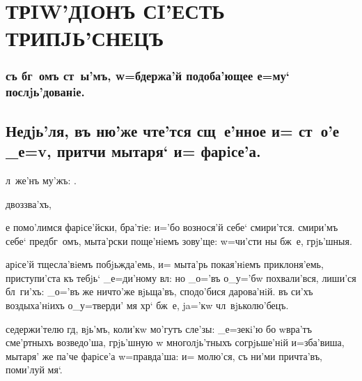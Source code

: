 \documentclass[12pt,a5paper,dvips,civil=antiqua]{hipbook}
\begin{document}

\maketitle

\stdsecondpage
\clearpage

\hdrcrosspage

\section[трiw'дiонъ]{\large\MakeUppercase{трiw'дiонъ сi'есть трипjь'снецъ}}

\subsubsection{съ бг~омъ ст~ы'мъ, w=бдержа'й подоба'ющее е=му` послjь'дованiе.}

\subsection[Недjь'ля мытаря` и= фарiсе'а]
{Недjь'ля, въ ню'же чте'тся сщ~е'нное и= ст~о'е _е=v, притчи
  мытаря` и= фарiсе'а.}

 л~же'нъ му'жъ: .

 д воззва'хъ, 

е помо'лимся фарiсе'йски, бра'тiе: и='бо вознося'й себе`
смири'тся. смири'мъ себе` пред\ъ бг~омъ, мыта'рски поще'нiемъ зову'ще:
w=чи'сти ны бж~е, грjь'шныя.

арiсе'й тщесла'вiемъ побjьжда'емь, и= мыта'рь покая'нiемъ
приклоня'емь, приступи'ста къ тебjь` _е=ди'ному вл: но _о='въ
о_у='бw похвали'вся, лиши'ся бл~ги'хъ: _о='въ же ничто'же вjьща'въ,
сподо'бися дарова'нiй. въ си'хъ воздыха'нiихъ о_у=тверди' мя хр`
бж~е, ja='кw чл~вjьколю'бецъ.

 седержи'телю гд, вjь'мъ, коли'кw мо'гутъ
сле'зы: _е=зекi'ю бо w\т вра'тъ сме'ртныхъ возведо'ша, грjь'шную w\т
многолjь'тныхъ согрjьше'нiй и=зба'виша, мытаря' же па'че фарiсе'а
w=правда'ша: и= молю'ся, съ ни'ми причта'въ, поми'луй мя`.
\end{document}
